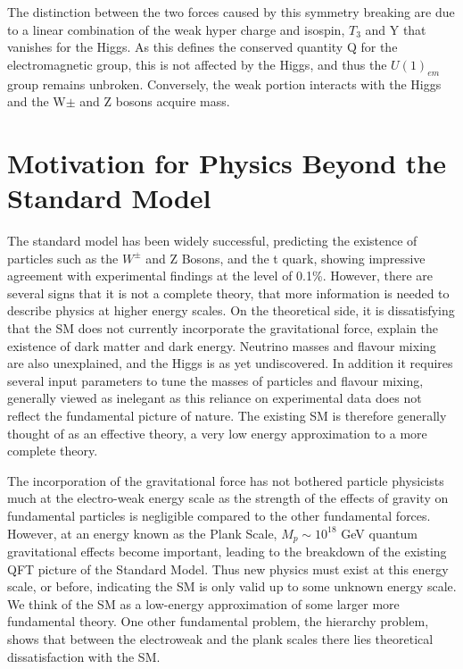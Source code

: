 The distinction between the two forces caused by this symmetry breaking are due to a linear combination of the weak hyper charge and isospin, $T_{3}$ and Y that vanishes for the Higgs. As this defines the conserved quantity Q for the electromagnetic group, this is not affected by the Higgs, and thus the $U(1)_{em}$ group remains unbroken. Conversely, the weak portion interacts with the Higgs and the W$\pm$ and Z bosons acquire mass.  

\section{Motivation for Physics Beyond the Standard Model}
The standard model has been widely successful, predicting the existence of particles such as the $W^{\pm}$ and Z Bosons, and the t quark, showing impressive agreement with experimental findings at the level of 0.1\%. However, there are several signs that it is not a complete theory, that more information is needed to describe physics at higher energy scales. On the theoretical side, it is dissatisfying that the SM does not currently incorporate the gravitational force, explain the existence of dark matter and dark energy. Neutrino masses and flavour mixing are also unexplained, and the Higgs is as yet undiscovered. In addition it requires several input parameters to tune the masses of particles and flavour mixing, generally viewed as inelegant as this reliance on experimental data does not reflect the fundamental picture of nature.  The existing SM is therefore generally thought of as an effective theory, a very low energy approximation to a more complete theory\cite{PeskinSch}.



The incorporation of the gravitational force has not bothered particle physicists much at the electro-weak energy scale as the strength of the effects of gravity on fundamental particles is negligible compared to the other fundamental forces. However, at an energy known as the Plank Scale, $M_{p} \sim 10^{18}$ GeV quantum gravitational effects become important, leading to the breakdown of the existing QFT picture of the Standard Model. Thus new physics must exist at this energy scale, or before, indicating the SM is only valid up to some unknown energy scale. We think of the SM as a low-energy approximation of some larger more fundamental theory. One other fundamental problem, the hierarchy problem, shows that between the electroweak and the plank scales there lies theoretical dissatisfaction with the SM. 

